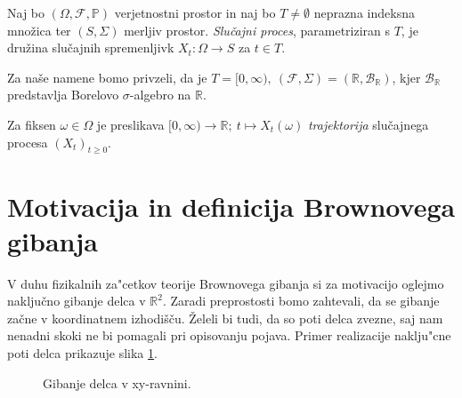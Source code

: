 \documentclass[twoside,11pt]{article}
\begin{document}
\begin{definicija}
    Naj bo $(\Omega, \mathcal{F}, \mathbb{P})$ verjetnostni prostor in naj bo $T\neq\emptyset$ neprazna
    indeksna množica ter $(S, \Sigma)$ merljiv prostor. \textit{Slučajni proces}, parametriziran
    s $T$, je družina slučajnih spremenljivk $X_t : \Omega \to S$ za $t \in T$.
\end{definicija}

\begin{opomba}
    Za naše namene bomo privzeli, da je $T = [0, \infty), \ (\mathcal{F}, \Sigma) = (\mathbb{R}, \mathcal{B}_{\mathbb{R}})$,
    kjer $\mathcal{B}_{\mathbb{R}}$ predstavlja Borelovo $\sigma$-algebro na $\mathbb{R}$. 
\end{opomba}
    
\begin{definicija}
    Za fiksen $\omega \in \Omega$ je preslikava 
    $[0, \infty) \rightarrow \mathbb{R}; \ t \mapsto X_t(\omega)$ 
    \textit{trajektorija} slučajnega procesa $(X_t)_{t\geq0}$.
\end{definicija}


\pagebreak

\section{Motivacija in definicija Brownovega gibanja}

V duhu fizikalnih za"cetkov teorije Brownovega gibanja si za motivacijo oglejmo naključno gibanje delca v $\mathbb{R}^2$.
Zaradi preprostosti bomo zahtevali, da se gibanje začne v koordinatnem izhodišču. Želeli bi tudi, da so 
poti delca zvezne, saj nam nenadni skoki ne bi pomagali pri opisovanju pojava. Primer realizacije naklju"cne
poti delca prikazuje slika \ref{fig:slika1}.

\begin{figure}[h]
    \centering

    \caption{Gibanje delca v xy-ravnini.}
    \label{fig:slika1}
\end{figure}
\end{document}
